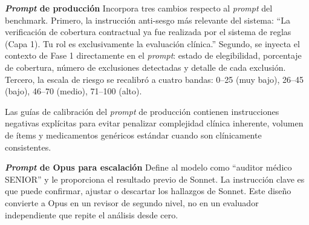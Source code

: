 \textbf{\textit{Prompt} de producción} Incorpora tres cambios respecto al \textit{prompt} del benchmark. Primero, la instrucción anti-sesgo más relevante del sistema: “La verificación de cobertura contractual ya fue realizada por el sistema de reglas (Capa 1). Tu rol es exclusivamente la evaluación clínica.” Segundo, se inyecta el contexto de Fase 1 directamente en el \textit{prompt}: estado de elegibilidad, porcentaje de cobertura, número de exclusiones detectadas y detalle de cada exclusión. Tercero, la escala de riesgo se recalibró a cuatro bandas: 0–25 (muy bajo), 26–45 (bajo), 46–70 (medio), 71–100 (alto).

Las guías de calibración del \textit{prompt} de producción contienen instrucciones negativas explícitas para evitar penalizar complejidad clínica inherente, volumen de ítems y medicamentos genéricos estándar cuando son clínicamente consistentes.

\textbf{\textit{Prompt} de Opus para escalación} Define al modelo como “auditor médico SENIOR” y le proporciona el resultado previo de Sonnet. La instrucción clave es que puede confirmar, ajustar o descartar los hallazgos de Sonnet. Este diseño convierte a Opus en un revisor de segundo nivel, no en un evaluador independiente que repite el análisis desde cero.
